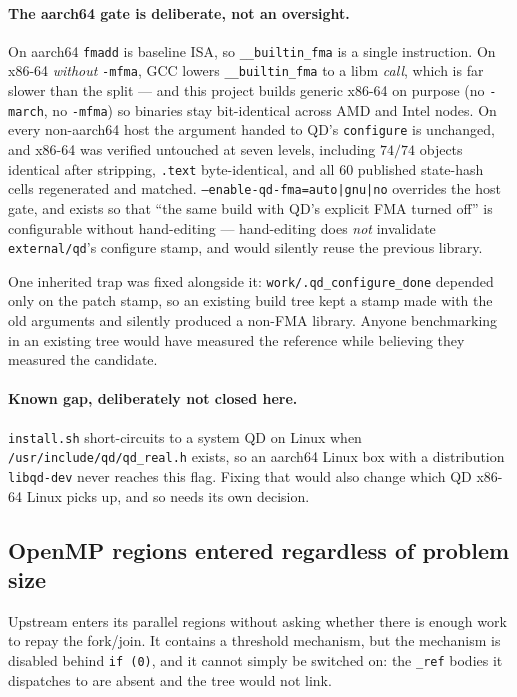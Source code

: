 \documentclass[11pt]{article}
\newcommand{\code}[1]{\texttt{#1}}
\begin{document}
\paragraph{The aarch64 gate is deliberate, not an oversight.} On aarch64 \code{fmadd} is baseline
ISA, so \code{\_\_builtin\_fma} is a single instruction. On x86-64 \emph{without} \code{-mfma}, GCC
lowers \code{\_\_builtin\_fma} to a libm \emph{call}, which is far slower than the split --- and
this project builds generic x86-64 on purpose (no \code{-march}, no \code{-mfma}) so binaries stay
bit-identical across AMD and Intel nodes. On every non-aarch64 host the argument handed to QD's
\code{configure} is unchanged, and x86-64 was verified untouched at seven levels, including $74/74$
objects identical after stripping, \code{.text} byte-identical, and all $60$ published state-hash
cells regenerated and matched. \code{--enable-qd-fma=auto|gnu|no} overrides the host gate, and
exists so that ``the same build with QD's explicit FMA turned off'' is configurable without
hand-editing --- hand-editing does \emph{not} invalidate \code{external/qd}'s configure stamp, and
would silently reuse the previous library.

One inherited trap was fixed alongside it: \code{work/.qd\_configure\_done} depended only on the
patch stamp, so an existing build tree kept a stamp made with the old arguments and silently
produced a non-FMA library. Anyone benchmarking in an existing tree would have measured the
reference while believing they measured the candidate.

\paragraph{Known gap, deliberately not closed here.} \code{install.sh} short-circuits to a system QD
on Linux when \code{/usr/include/qd/qd\_real.h} exists, so an aarch64 Linux box with a distribution
\code{libqd-dev} never reaches this flag. Fixing that would also change which QD x86-64 Linux picks
up, and so needs its own decision.

\subsection{OpenMP regions entered regardless of problem size}

Upstream enters its parallel regions without asking whether there is enough work to repay the
fork/join. It contains a threshold mechanism, but the mechanism is disabled behind \code{if (0)},
and it cannot simply be switched on: the \code{\_ref} bodies it dispatches to are absent and the
tree would not link.
\end{document}
